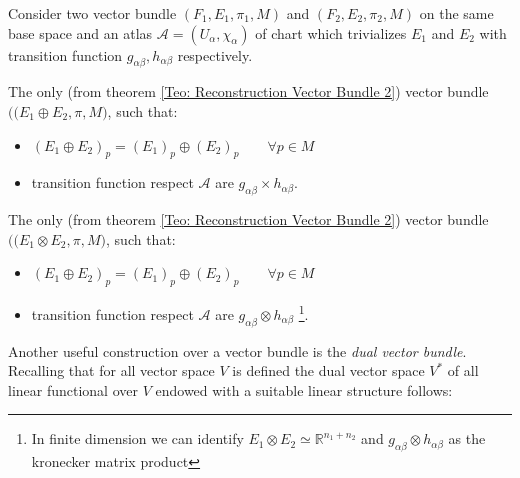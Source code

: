\documentclass[a4paper,12pt]{scrartcl}    %
\begin{document}
Consider two vector bundle $(F_1,E_1,\pi_1,M)$ and $(F_2,E_2,\pi_2,M)$ on the same base space and an atlas $\mathcal{A}=(U_\alpha, \chi_\alpha )$ of chart which trivializes $E_1$ and $E_2$ with transition function $g_{\alpha \beta}, h_{\alpha \beta}$ respectively.
\begin{definition}
	The only (from theorem \ref{Teo: Reconstruction Vector Bundle 2}) vector bundle $\big( (E_1 \oplus E_2, \pi,M \big)$, such that:
	\begin{itemize}
		\item $(E_1 \oplus E_2 ) _p = ( E_1)_p \oplus (E_2)_p \qquad \forall p \in M$
		\item transition function respect $\mathcal{A}$ are $g_{\alpha \beta} \times h_{\alpha 	\beta}$.
	\end{itemize}
\end{definition}

\begin{definition}
	The only (from theorem \ref{Teo: Reconstruction Vector Bundle 2}) vector bundle $\big( (E_1 \otimes E_2, \pi,M \big)$, such that:
	\begin{itemize}
		\item $(E_1 \oplus E_2 ) _p = ( E_1)_p \oplus (E_2)_p \qquad \forall p \in M$
		\item transition function respect $\mathcal{A}$ are $g_{\alpha \beta} \otimes h_{\alpha 	\beta}$ \footnote{In finite dimension we can identify $E_1 \otimes E_2 \simeq \mathbb{R}^{n_1 + n_2}$ and $g_{\alpha \beta} \otimes h_{\alpha 	\beta}$ as the kronecker matrix product}.
	\end{itemize}
\end{definition}

\vspace{10mm}
Another useful construction over a vector bundle is the \emph{dual vector bundle}.
\\
Recalling that for all vector space $V$ is defined the dual vector space $V^*$ of all linear functional over $V$ endowed with a suitable linear structure follows:
\end{document}
